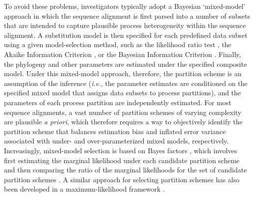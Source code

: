 \documentclass[11pt]{article}
\begin{document}
To avoid these problems, investigators typically adopt a Bayesian `mixed-model' approach \citep[{\it e.g.},][]{ronquist03} in which the sequence alignment is first parsed into a number of subsets that are intended to capture plausible process heterogeneity within the sequence alignment. 
A substitution model is then specified for each predefined data subset using a given model-selection method, such as the likelihood ratio test \citep[LRT;][]{Darriba2012}, the Akaike Information Criterion \citep[AIC;][]{Akaike1974}, or the Bayesian Information Criterion \citep[BIC][]{Schwarz1978}.
Finally, the phylogeny and other parameters are estimated under the specified composite model.
Under this mixed-model approach, therefore, the partition scheme is an assumption of the inference ({\it i.e.}, the parameter estimates are conditioned on the specified mixed model that assigns data subsets to process partitions), and the parameters of each process partition are independently estimated.
For most sequence alignments, a vast number of partition schemes of varying complexity are plausible {\it a priori}, which therefore requires a way to objectively identify the partition scheme that balances estimation bias and inflated error variance associated with under- and over-parameterized mixed models, respectively.
Increasingly, mixed-model selection is based on Bayes factors \citep[{\it e.g.},][]{suchard01}, which involves first estimating the marginal likelihood under each candidate partition scheme and then comparing the ratio of the marginal likelihoods for the set of candidate partition schemes \citep[{\it e.g.},][]{brandley05,nylander04,mcguire07}.
A similar approach for selecting partition schemes has also been developed in a maximum-likelihood framework \citep[][]{Lanfear2012}.
 
\end{document}
